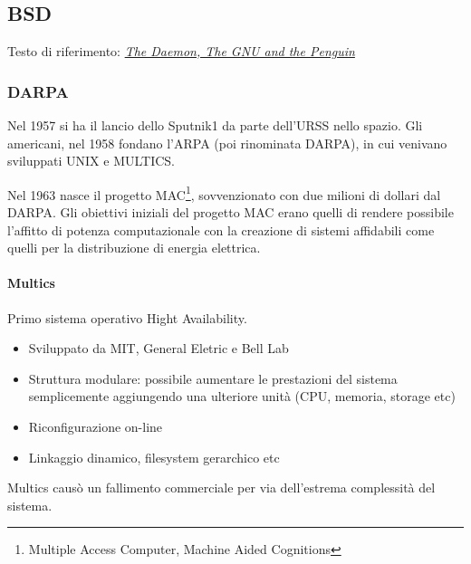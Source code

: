 \subsection{BSD}

Testo di riferimento: \href{http://www.groklaw.net/staticpages/index.php?page=20051013231901859}{\textit{The Daemon, The GNU and the Penguin}}

\subsubsection{DARPA}

Nel 1957 si ha il lancio dello Sputnik1 da parte dell'URSS nello spazio. Gli americani, nel 1958 fondano l'ARPA (poi rinominata DARPA), in cui venivano sviluppati UNIX e MULTICS.

Nel 1963 nasce il progetto MAC\footnote{Multiple Access Computer, Machine Aided Cognitions}, sovvenzionato con due milioni di dollari dal DARPA. Gli obiettivi iniziali del progetto MAC erano quelli di rendere possibile l'affitto di potenza computazionale con la creazione di sistemi affidabili come quelli per la distribuzione di energia elettrica.

\paragraph*{Multics} Primo sistema operativo Hight Availability. \begin{itemize}

\item Sviluppato da MIT, General Eletric e Bell Lab
\item Struttura modulare: possibile aumentare le prestazioni del sistema semplicemente aggiungendo una ulteriore unit\`a (CPU, memoria, storage etc)
\item Riconfigurazione on-line
\item Linkaggio dinamico, filesystem gerarchico etc

\end{itemize}

Multics caus\`o un fallimento commerciale per via dell'estrema complessit\`a del sistema.

